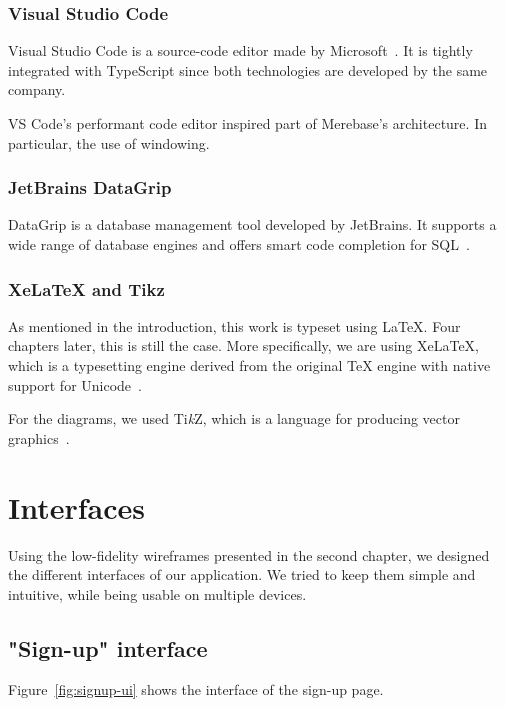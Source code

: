 \subsubsection{Visual Studio Code}

Visual Studio Code is a source-code editor made by Microsoft~\autocite{noauthor_visual_nodate}.
It is tightly integrated with TypeScript since both technologies are developed by the same company.

VS Code's performant code editor inspired part of Merebase's architecture. In particular, the use of windowing.

\subsubsection{JetBrains DataGrip}

DataGrip is a database management tool developed by JetBrains. It supports a wide range of database engines and offers smart code completion for SQL~\autocite{noauthor_datagrip:_nodate}.

\subsubsection{XeLaTeX and Tikz}

As mentioned in the introduction, this work is typeset using \LaTeX. Four chapters later, this is still the case.
More specifically, we are using XeLaTeX, which is a typesetting engine derived from the original TeX engine with native support for Unicode~\autocite{noauthor_xelatex_nodate}.

For the diagrams, we used Ti\emph{k}Z, which is a language for producing vector graphics~\autocite{noauthor_tikz_nodate}.

\section{Interfaces}

Using the low-fidelity wireframes presented in the second chapter, we designed the different interfaces of our application.
We tried to keep them simple and intuitive, while being usable on multiple devices.


\subsection{"Sign-up" interface}
Figure~\ref{fig:signup-ui} shows the interface of the sign-up page.



